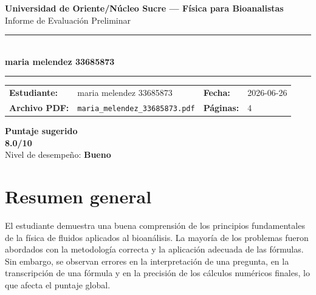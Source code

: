 \documentclass[11pt,a4paper]{article}
\begin{document}
\begin{center}
  {\Large\bfseries\color{azulTitulo} Universidad de Oriente/Núcleo Sucre --- Física para Bioanalistas}\\[4pt]
  {\large Informe de Evaluación Preliminar}\\[12pt]
  \rule{\linewidth}{1.2pt}\\[6pt]
  {\LARGE\bfseries maria melendez 33685873}\\[4pt]
  \rule{\linewidth}{0.6pt}
\end{center}

\vspace{4pt}
\begin{tcolorbox}[cajaTitulo, title=Datos del informe]
\begin{tabular}{@{}llll@{}}
  \textbf{Estudiante:}  & maria melendez 33685873  &
  \textbf{Fecha:}       & 2026-06-26 \\[4pt]
  \textbf{Archivo PDF:} & \texttt{maria\_melendez\_33685873.pdf}  &
  \textbf{Páginas:}     & 4 \\
\end{tabular}
\end{tcolorbox}

\vspace{6pt}
\begin{center}
  \begin{tcolorbox}[
    enhanced,
    colback=white, colframe=desempeno_bueno,
    width=0.62\linewidth,
    boxrule=2pt,
    halign=center, valign=center,
    top=8pt, bottom=8pt,
  ]
    \centering
    {\large\bfseries Puntaje sugerido}\\[6pt]
    {\Huge\bfseries\color{desempeno_bueno} 8.0/10}\\[6pt]
    {\large Nivel de desempeño: \textbf{\color{desempeno_bueno} Bueno}}
  \end{tcolorbox}
\end{center}

\section*{Resumen general}
El estudiante demuestra una buena comprensión de los principios fundamentales de la física de fluidos aplicados al bioanálisis. La mayoría de los problemas fueron abordados con la metodología correcta y la aplicación adecuada de las fórmulas. Sin embargo, se observan errores en la interpretación de una pregunta, en la transcripción de una fórmula y en la precisión de los cálculos numéricos finales, lo que afecta el puntaje global.
\end{document}
